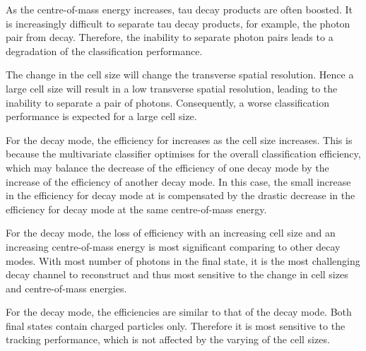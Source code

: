 

As the centre-of-mass energy increases, tau decay products are often boosted. It is increasingly difficult to separate tau decay products, for example, the photon pair from \Ppizero decay. Therefore, the inability to separate photon pairs leads to a degradation of  the classification performance.

The change in the \ECAL cell size will change the transverse spatial resolution. Hence a large cell size will result in a low transverse spatial resolution, leading to the inability to separate a pair of photons. Consequently, a worse classification performance is expected for a large \ECAL cell size.




For the \decayRhoShort decay mode, the efficiency for   increases as the cell size increases. This is because the multivariate classifier optimises for the overall classification efficiency, which may balance the decrease of the efficiency of one decay mode by the increase of the efficiency of another decay mode. In this case, the small increase in the efficiency for \decayRhoShort decay mode at  is compensated by the drastic decrease in the efficiency for \decayAiPhotonShort decay mode at the same centre-of-mass energy.

For the \decayAiPhotonShort decay mode, the loss of efficiency with an increasing \ECAL  cell size and an increasing centre-of-mass energy is most significant comparing to other decay modes. With most number of photons in the final state, it is the most challenging decay channel to reconstruct and thus most sensitive to the change in cell sizes and centre-of-mass energies.

For the \decayAiPionShort decay mode, the efficiencies are similar to that of the \decayPionShort decay mode. Both final states contain charged particles only. Therefore it is most sensitive to the tracking performance, which is not affected by the  varying of the \ECAL cell sizes.


